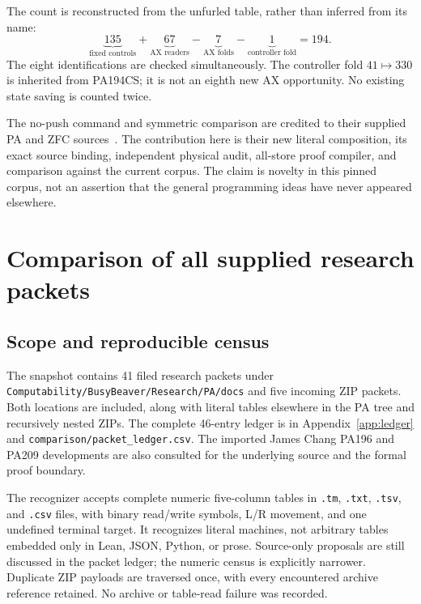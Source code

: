 \documentclass[11pt,letterpaper]{article}
\newcommand{\file}[1]{\texttt{\nolinkurl{#1}}}
\begin{document}
The count is reconstructed from the unfurled table, rather than inferred
from its name:
\begin{equation}\label{eq:state-count}
   \underbrace{135}_{\text{fixed controls}}
   +\underbrace{67}_{\text{AX readers}}
   -\underbrace{7}_{\text{AX folds}}
   -\underbrace{1}_{\text{controller fold}}
   =194.
\end{equation}
The eight identifications are checked simultaneously. The controller fold
$41\mapsto330$ is inherited from PA194CS; it is not an eighth new AX
opportunity. No existing state saving is counted twice.

The no-push command and symmetric comparison are credited to their
supplied PA and ZFC sources~\cite{n,r,zfc}. The contribution here is their new literal
composition, its exact source binding, independent physical audit,
all-store proof compiler, and comparison against the current corpus.
The claim is novelty in this pinned corpus, not an assertion that the
general programming ideas have never appeared elsewhere.

\section{Comparison of all supplied research packets}
\label{sec:comparison}

\subsection{Scope and reproducible census}

The snapshot contains 41 filed research packets under
\file{Computability/BusyBeaver/Research/PA/docs} and five incoming ZIP
packets. Both locations are included, along with literal tables elsewhere
in the PA tree and recursively nested ZIPs. The complete 46-entry ledger
is in Appendix~\ref{app:ledger} and \file{comparison/packet_ledger.csv}.
The imported James Chang PA196 and PA209 developments are also consulted
for the underlying source and the formal proof boundary.

The recognizer accepts complete numeric five-column tables in
\file{.tm}, \file{.txt}, \file{.tsv}, and \file{.csv} files, with binary
read/write symbols, L/R movement, and one undefined terminal target.
It recognizes literal machines, not arbitrary tables embedded only in
Lean, JSON, Python, or prose. Source-only proposals are still discussed
in the packet ledger; the numeric census is explicitly narrower.
Duplicate ZIP payloads are traversed once, with every encountered archive
reference retained. No archive or table-read failure was recorded.
\end{document}
